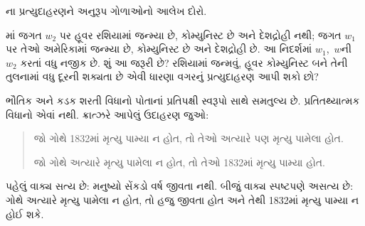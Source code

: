 \begin{prob}
ના પ્રત્યુદાહરણને અનુરૂપ
ગોળાઓનો આલેખ દોરો.
\end{prob}

\begin{prob}
  માં જગત $w_2$ પર હૂવર
  રશિયામાં જન્મ્યા છે, કોમ્યુનિસ્ટ છે અને દેશદ્રોહી નથી; જગત $w_1$
  પર તેઓ અમેરિકામાં જન્મ્યા છે, કોમ્યુનિસ્ટ છે અને દેશદ્રોહી છે.
  આ નિદર્શમાં $w_1$,~$w$ની $w_2$ કરતાં વધુ નજીક છે. શું આ જરૂરી
  છે? રશિયામાં જન્મવું, હૂવર કોમ્યુનિસ્ટ બને તેની તુલનામાં વધુ દૂરની
  શક્યતા છે એવી ધારણા વગરનું પ્રત્યુદાહરણ આપી શકો છો?
\end{prob}
\endgroup


\begingroup
\makeatletter{}\makeatother


\label{guunit:OLP-0528}


ભૌતિક અને કડક શરતી વિધાનો પોતાનાં પ્રતિપક્ષી સ્વરૂપો સાથે સમતુલ્ય
છે. પ્રતિતથ્યાત્મક વિધાનો એવાં નથી. ક્રાત્ઝરે આપેલું ઉદાહરણ જુઓ:
\begin{quote}
  જો ગોથે 1832માં મૃત્યુ પામ્યા ન હોત, તો તેઓ અત્યારે પણ મૃત્યુ પામેલા હોત.

  જો ગોથે અત્યારે મૃત્યુ પામેલા ન હોત, તો તેઓ 1832માં મૃત્યુ પામ્યા હોત.
\end{quote}
પહેલું વાક્ય સત્ય છે: મનુષ્યો સેંકડો વર્ષ જીવતા નથી. બીજું વાક્ય
સ્પષ્ટપણે અસત્ય છે: ગોથે અત્યારે મૃત્યુ પામેલા ન હોત, તો હજુ જીવતા
હોત અને તેથી 1832માં મૃત્યુ પામ્યા ન હોઈ શકે.

